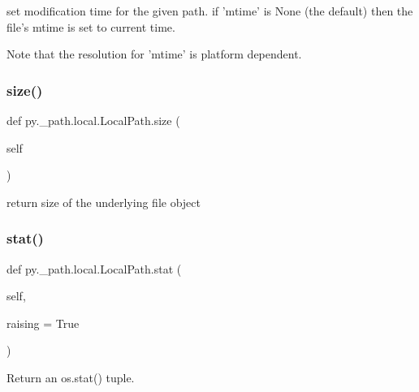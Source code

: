 \begin{DoxyVerb}set modification time for the given path.  if 'mtime' is None
(the default) then the file's mtime is set to current time.

Note that the resolution for 'mtime' is platform dependent.
\end{DoxyVerb}
 \mbox{\label{classpy_1_1__path_1_1local_1_1_local_path_a620c3120f5d2ede7f1c227e802504f66}} 
\subsubsection{\texorpdfstring{size()}{size()}}
{\footnotesize\ttfamily def py.\+\_\+path.\+local.\+Local\+Path.\+size (\begin{DoxyParamCaption}\item[{}]{self }\end{DoxyParamCaption})}

\begin{DoxyVerb}return size of the underlying file object \end{DoxyVerb}
 \mbox{\label{classpy_1_1__path_1_1local_1_1_local_path_a98794b5e076a80672f971cfee84435b2}} 
\subsubsection{\texorpdfstring{stat()}{stat()}}
{\footnotesize\ttfamily def py.\+\_\+path.\+local.\+Local\+Path.\+stat (\begin{DoxyParamCaption}\item[{}]{self,  }\item[{}]{raising = {\ttfamily True} }\end{DoxyParamCaption})}

\begin{DoxyVerb}Return an os.stat() tuple. \end{DoxyVerb}
 \mbox{\label{classpy_1_1__path_1_1local_1_1_local_path_a06b81c811303619ce05c4ab93a11e686}} 
